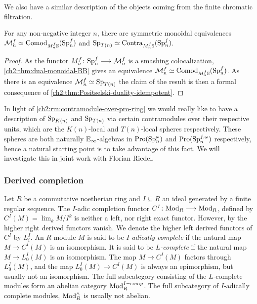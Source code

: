 We also have a similar description of the objects coming from the finite chromatic filtration. 

\begin{proposition}
    For any non-negative integer $n$, there are symmetric monoidal equivalences $\mathcal{M}_{n}^f \simeq \mathrm{Comod}_{M^f_n\mathbb{S}}(\mathrm{Sp}^f_n)$ and $\mathrm{Sp}_{T(n)}\simeq \mathrm{Contra}_{M^f_n\mathbb{S}}(\mathrm{Sp}^f_n)$.
\end{proposition}
\begin{proof}
    As the functor $M_n^f\colon \mathrm{Sp}_n^f \longrightarrow \mathcal{M}_n^f$ is a smashing colocalization, \cref{ch2:thm:dual-monoidal-BB} gives an equivalence $\mathcal{M}_n^f \simeq \mathrm{Comod}_{M_n^f \mathbb{S}}(\mathrm{Sp}_n^f)$. As there is an equivalence $\mathcal{M}_n^f \simeq \mathrm{Sp}_{T(n)}$ the claim of the result is then a formal consequence of \cref{ch2:thm:Positselski-duality-idempotent}.
\end{proof}

\begin{remark}
    In light of \cref{ch2:rm:contramodule-over-pro-ring} we would really like to have a description of $\mathrm{Sp}_{K(n)}$ and $\mathrm{Sp}_{T(n)}$ via certain contramodules over their respective units, which are the $K(n)$-local and $T(n)$-local spheres respectively. These spheres are both naturally $\mathbb{E}_\infty$-algebras in $\operatorname{Pro}(\mathrm{Sp}_n^\omega)$ and $\operatorname{Pro}(\mathrm{Sp}_n^{f, \omega})$ respectively, hence a natural starting point is to take advantage of this fact. We will investigate this in joint work with Florian Riedel. 
\end{remark}

\subsubsection*{Derived completion}
\label{ch2:ssec:derived-completion}

Let $R$ be a commutative noetherian ring and $I\subseteq R$ an ideal generated by a finite regular sequence. The $I$-adic completion functor $C^I\colon \mathrm{Mod}_R \longrightarrow \mathrm{Mod}_R$, defined by $C^I(M)=\lim_k M/I^k$ is neither a left, nor right exact functor. However, by \cite[5.1]{greenlees-may_92} the higher right derived functors vanish. We denote the higher left derived functors of $C^I$ by $L^I_i$. An $R$-module $M$ is said to be \emph{$I$-adically complete} if the natural map $M\to C^I (M)$ is an isomorphism. It is said to be \emph{$L$-complete} if the natural map $M\to L_0^I(M)$ is an isomorphism. The map $M\to C^I(M)$ factors through $L_0^I(M)$, and the map $L_0^I(M)\to C^I(M)$ is always an epimorphism, but usually not an isomorphism. The full subcategory consisting of the $L$-complete modules form an abelian category $\mathrm{Mod}_R^{I-comp}$. The full subcategory of $I$-adically complete modules, $\mathrm{Mod}_R^\wedge$ is usually not abelian. 

